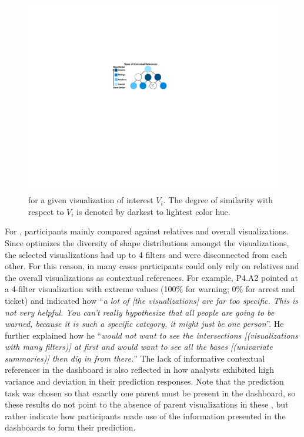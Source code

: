 \begin{figure}[h!]
\centering
\includegraphics[width=0.7\linewidth]{figures/contextual_reference.pdf}
\caption{ for a given visualization of interest $V_i$. The degree of similarity with respect to $V_i$ is denoted by darkest to lightest color hue.}
\label{fig:reference}
\end{figure}
\par {} For \cluster, participants mainly compared against relatives and overall visualizations. Since \cluster optimizes the diversity of shape distributions amongst the visualizations, the selected visualizations had up to 4 filters and were disconnected from each other. For this reason, in many cases\change{,} participants could only rely on relatives and the overall visualizations as contextual references. For example, P4.A2 pointed at a 4-filter visualization with extreme values (100\% for warning; 0\% for arrest and ticket) and indicated how ``\textit{a lot of [the visualizations] are far too specific. This is not very helpful. You can't really hypothesize that all people are \change{[sic]} going to be warned, because it is such a specific category, it might just be one person}''. %
He further explained how he ``\textit{would not want to see the intersections [(visualizations with many filters)] at first and would want to see all the bases [(univariate summaries)] then dig in from there.}'' The lack of informative contextual references in the \cluster dashboard is also reflected in how analysts exhibited high variance and deviation in their prediction responses. Note that the prediction task was chosen so that exactly one parent must be present in the dashboard, so these results do not point to the absence of parent visualizations in these , but rather indicate how participants made use of the information presented in the dashboards to form their prediction.
